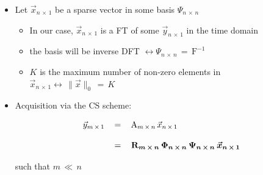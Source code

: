 \documentclass[12pt,a4paper]{book}
\begin{document}
\begin{itemize}

\item Let $\Vec{x}_{n \, \times \, 1}$ be a sparse vector in some basis $\Psi_{n \, \times \, n}$

    \begin{itemize}
        \item In our case, $\Vec{x}_{n \, \times \, 1}$ is a FT of some $\Vec{y}_{n \, \times \, 1}$ in the time domain
        
        \item the basis will be inverse DFT $ \leftrightarrow \Psi_{n \, \times \, n} \, = \, \text{F}^{-1} $
        
        \item $K$ is the maximum number of non-zero elements in $\Vec{x}_{n \, \times \, 1} \leftrightarrow \, \lVert \Vec{x} \rVert_0 \,  = \, K$
        
        
    \end{itemize}

\item Acquisition via the CS scheme:

\begin{equation}
\begin{array}{lll}
     \Vec{y}_{m \, \times \, 1} \, &=& \, \text{A}_{m \, \times \, n} \, \Vec{x}_{n \, \times \, 1} \\ \\
      &=& \, \textbf{R}_{m \, \times \, n} \,  \boldmath\Phi_{n \, \times \, n} \, \boldsymbol\Psi_{n \, \times \, n} \, \Vec{x}_{n \, \times \, 1} 
\end{array}
\end{equation}

such that $m \, \ll \, n$


\end{itemize}







\end{document}

